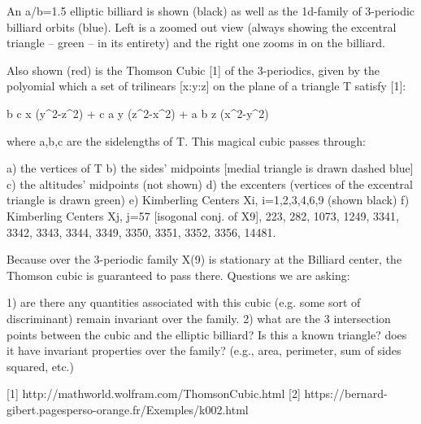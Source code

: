 An a/b=1.5 elliptic billiard is shown (black) as well as the 1d-family of 3-periodic billiard orbits (blue). Left is a zoomed out view (always showing the excentral triangle -- green -- in its entirety) and the right one zooms in on the billiard.

Also shown (red) is the Thomson Cubic [1] of the 3-periodics, given by the polyomial which a set of trilinears [x:y:z] on the plane of a triangle T satisfy [1]:

b c x (y^2-z^2) + c a y (z^2-x^2) + a b z (x^2-y^2)

where a,b,c are the sidelengths of T. This magical cubic passes through:

a) the vertices of T
b) the sides' midpoints [medial triangle is drawn dashed blue]
c) the altitudes' midpoints (not shown)
d) the excenters (vertices of the excentral triangle is drawn green)
e) Kimberling Centers Xi, i=1,2,3,4,6,9 (shown black)
f) Kimberling Centers Xj, j=57 [isogonal conj. of X9], 223, 282, 1073, 1249, 3341, 3342, 3343, 3344, 3349, 3350, 3351, 3352, 3356, 14481.

Because over the 3-periodic family X(9) is stationary at the Billiard center, the Thomson cubic is guaranteed to pass there. Questions we are asking:

1) are there any quantities associated with this cubic (e.g. some sort of discriminant) remain invariant over the family.
2) what are the 3 intersection points between the cubic and the elliptic billiard? Is this a known triangle? does it have invariant properties over the family? (e.g., area, perimeter, sum of sides squared, etc.)

[1] http://mathworld.wolfram.com/ThomsonCubic.html 
[2] https://bernard-gibert.pagesperso-orange.fr/Exemples/k002.html